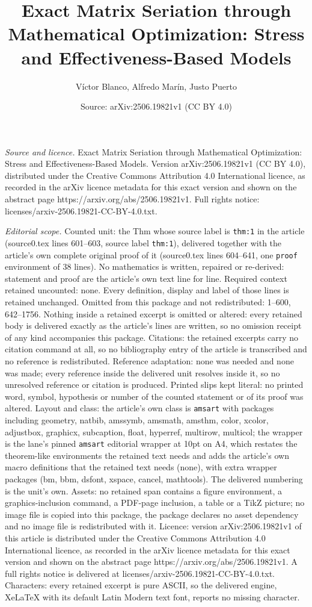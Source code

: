 \documentclass[10pt,a4paper]{amsart}
\title[Exact Matrix Seriation through Mathematical Optimization: St]{Exact Matrix Seriation through Mathematical Optimization: Stress and Effectiveness-Based Models}
\author{V\'ictor Blanco, Alfredo Mar\'in, Justo Puerto}
\date{Source: arXiv:2506.19821v1 (CC BY 4.0)}
\begin{document}
\maketitle

\noindent\emph{Source and licence.} Exact Matrix Seriation through Mathematical Optimization: Stress and Effectiveness-Based Models. Version arXiv:2506.19821v1 (CC BY 4.0), distributed under the Creative Commons Attribution 4.0 International licence, as recorded in the arXiv licence metadata for this exact version and shown on the abstract page https://arxiv.org/abs/2506.19821v1. Full rights notice: licenses/arxiv-2506.19821-CC-BY-4.0.txt.\par\smallskip

\noindent\textit{Editorial scope.} Counted unit: the Thm whose source label is \texttt{thm:1} in the article (source0.tex lines 601--603, source label \texttt{thm:1}), delivered together with the article's own complete original proof of it (source0.tex lines 604--641, one \texttt{proof} environment of 38 lines). No mathematics is written, repaired or re-derived: statement and proof are the article's own text line for line. Required context retained uncounted: none. Every definition, display and label of those lines is retained unchanged. Omitted from this package and not redistributed: 1--600, 642--1756. Nothing inside a retained excerpt is omitted or altered: every retained body is delivered exactly as the article's lines are written, so no omission receipt of any kind accompanies this package. Citations: the retained excerpts carry no citation command at all, so no bibliography entry of the article is transcribed and no reference is redistributed. Reference adaptation: none was needed and none was made; every reference inside the delivered unit resolves inside it, so no unresolved reference or citation is produced. Printed slips kept literal: no printed word, symbol, hypothesis or number of the counted statement or of its proof was altered. Layout and class: the article's own class is \texttt{amsart} with packages including geometry, natbib, amssymb, amsmath, amsthm, color, xcolor, adjustbox, graphicx, subcaption, float, hyperref, multirow, multicol; the wrapper is the lane's pinned \texttt{amsart} editorial wrapper at 10pt on A4, which restates the theorem-like environments the retained text needs and adds the article's own macro definitions that the retained text needs (none), with extra wrapper packages (bm, bbm, dsfont, xspace, cancel, mathtools). The delivered numbering is the unit's own. Assets: no retained span contains a figure environment, a graphics-inclusion command, a PDF-page inclusion, a table or a TikZ picture; no image file is copied into this package, the package declares no asset dependency and no image file is redistributed with it. Licence: version arXiv:2506.19821v1 of this article is distributed under the Creative Commons Attribution 4.0 International licence, as recorded in the arXiv licence metadata for this exact version and shown on the abstract page https://arxiv.org/abs/2506.19821v1. A full rights notice is delivered at licenses/arxiv-2506.19821-CC-BY-4.0.txt. Characters: every retained excerpt is pure ASCII, so the delivered engine, XeLaTeX with its default Latin Modern text font, reports no missing character.
\end{document}
